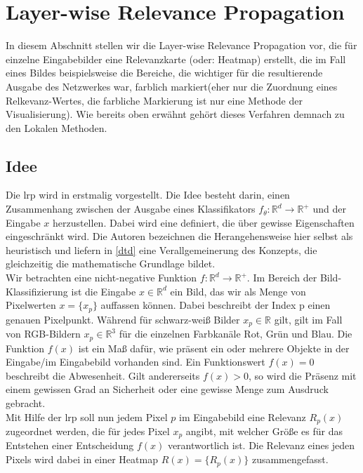 \documentclass[11pt,a4paper]{article}
\numberwithin{equation}{section}
\begin{document}
	\section{Layer-wise Relevance Propagation} \label{chapter_lrp}
	In diesem Abschnitt stellen wir die Layer-wise Relevance Propagation vor, die für einzelne Eingabebilder eine Relevanzkarte (oder: Heatmap) erstellt, die im Fall eines Bildes beispielsweise die Bereiche, die wichtiger für die resultierende Ausgabe des Netzwerkes war, farblich markiert(eher nur die Zuordnung eines Relkevanz-Wertes, die farbliche Markierung ist nur eine Methode der Visualisierung). Wie bereits oben erwähnt gehört dieses Verfahren demnach zu den Lokalen Methoden.
	
	\subsection{Idee}
	
	Die \gls{lrp} wird in \cite{LRP_first_paper} erstmalig vorgestellt. Die Idee besteht darin, einen Zusammenhang zwischen der Ausgabe eines Klassifikators $f_{\theta}: \mathbb{R}^d\to \mathbb{R^{+}}$ und der Eingabe $x$ herzustellen. Dabei wird eine definiert, die über gewisse Eigenschaften eingeschränkt wird. Die Autoren bezeichnen die Herangehensweise hier selbst als heuristisch und liefern in \ref{dtd} eine Verallgemeinerung des Konzepts, die gleichzeitig die mathematische Grundlage bildet.\\
	
	Wir betrachten eine nicht-negative Funktion $f: \mathbb{R}^d \to \mathbb{R}^{+}$. Im Bereich der Bild-Klassifizierung ist die Eingabe $x \in \mathbb{R}^d$ ein Bild, das wir als Menge von Pixelwerten $x=\lbrace x_p \rbrace$ auffassen können. Dabei beschreibt der Index p einen genauen Pixelpunkt. Während für schwarz-weiß Bilder $x_p \in \mathbb{R}$ gilt, gilt im Fall von RGB-Bildern $x_p \in \mathbb{R}^3$ für die einzelnen Farbkanäle Rot, Grün und Blau. Die Funktion $f(x)$ ist ein Maß dafür, wie präsent ein oder mehrere Objekte in der Eingabe/im Eingabebild vorhanden sind. Ein Funktionswert $f(x)=0$ beschreibt die Abwesenheit. Gilt andererseits $f(x) >0$, so wird die Präsenz mit einem gewissen Grad an Sicherheit oder eine gewisse Menge zum Ausdruck gebracht.\\
	
	Mit Hilfe der \gls{lrp} soll nun jedem Pixel $p$ im Eingabebild eine Relevanz $R_p(x)$ zugeordnet werden, die für jedes Pixel $x_p$ angibt, mit welcher Größe es für das Entstehen einer Entscheidung $f(x)$ verantwortlich ist. Die Relevanz eines jeden Pixels wird dabei in einer Heatmap $R(x) = \lbrace R_p(x) \rbrace$ zusammengefasst.
	
\end{document}

